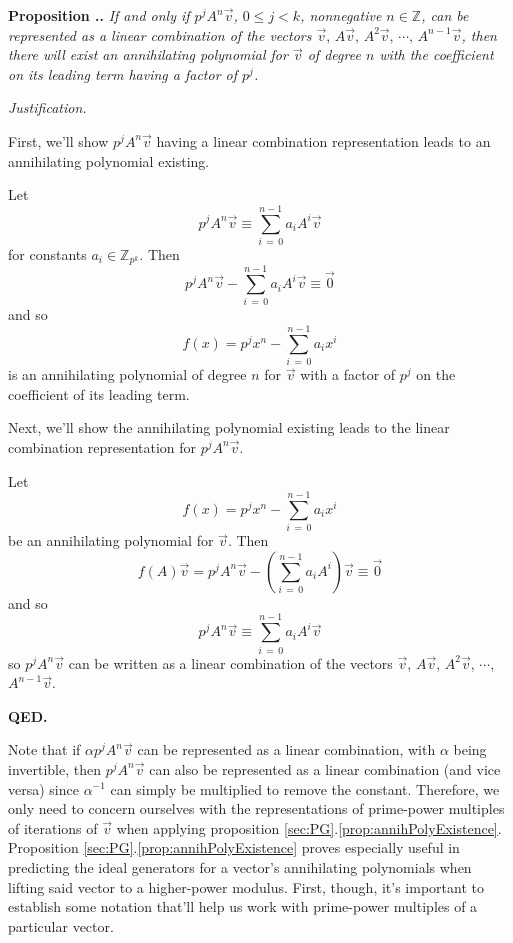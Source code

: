 \documentclass[a4paper, reqno, 12pt]{amsart}
\newcounter{propcounter}[section]
\newenvironment{proposition}[1]
{
	\refstepcounter{propcounter}
	\textbf{Proposition \thesection.\thepropcounter.} \emph{#1}
	
	\emph{Justification.}
}
{
	\textbf{QED.} \\
}
\begin{document}
		\begin{proposition}{If and only if $p^jA^n\vec{v}$, $0 \leq j < k$, nonnegative $n \in \mathds{Z}$, can be represented as a linear combination of the vectors 
		$\vec{v},\, A\vec{v},\, A^2\vec{v},\, \cdots,\, A^{n-1}\vec{v}$, then there will exist an annihilating polynomial for $\vec{v}$ of degree $n$ with the coefficient 
		on its leading term having a factor of $p^j$.}
			\label{prop:annihPolyExistence}
			First, we'll show $p^jA^n\vec{v}$ having a linear combination representation leads to an annihilating polynomial existing.
			
			Let
			\[
				p^jA^n\vec{v} \equiv \sum_{i\,=\,0}^{n-1} a_iA^i\vec{v}
			\]
			for constants $a_i \in \mathds{Z}_{p^k}$. Then
			\[
				p^jA^n\vec{v} - \sum_{i\,=\,0}^{n-1} a_iA^i\vec{v} \equiv \vec{0}
			\]
			and so
			\[
				f(x) = p^jx^n - \sum_{i\,=\,0}^{n-1} a_ix^i
			\]
			is an annihilating polynomial of degree $n$ for $\vec{v}$ with a factor of $p^j$ on the coefficient of its leading term.
			
			Next, we'll show the annihilating polynomial existing leads to the linear combination representation for $p^jA^n\vec{v}$.
			
			Let 
			\[
				f(x) = p^jx^n - \sum_{i\,=\,0}^{n-1} a_ix^i
			\]
			be an annihilating polynomial for $\vec{v}$. Then
			\[
				f(A)\vec{v} = p^jA^n\vec{v} - \left(\sum_{i\,=\,0}^{n-1} a_iA^i \right)\vec{v} \equiv \vec{0}
			\]
			and so
			\[
				p^jA^n\vec{v} \equiv \sum_{i\,=\,0}^{n-1} a_iA^i\vec{v}
			\]
			so $p^jA^n\vec{v}$ can be written as a linear combination of the vectors $\vec{v}$, $A\vec{v}$, $A^2\vec{v}$, $\cdots$, $A^{n-1}\vec{v}$.
		\end{proposition}
		
		Note that if $\alpha p^jA^n\vec{v}$ can be represented as a linear combination, with $\alpha$ being invertible, then $p^jA^n\vec{v}$ can also be represented as a 
		linear combination (and vice versa) since $\alpha^{-1}$ can simply be multiplied to remove the constant. Therefore, we only need to concern ourselves with the 
		representations of prime-power multiples of iterations of $\vec{v}$ when applying proposition \ref{sec:PG}.\ref{prop:annihPolyExistence}.
		Proposition \ref{sec:PG}.\ref{prop:annihPolyExistence} proves especially useful in predicting the ideal generators for a vector's annihilating polynomials when 
		lifting said vector to a higher-power modulus. First, though, it's important to establish some notation that'll help us work with prime-power multiples of a 
		particular vector.
		
\end{document}
